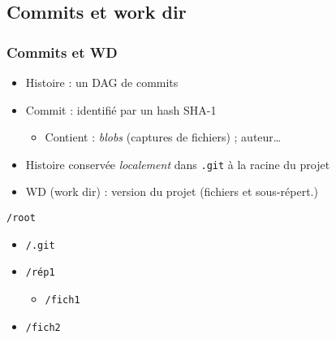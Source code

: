 \documentclass[english, french]{beamer}
\begin{document}
\subsection[Commits et work dir]{Commits et work dir}
\begin{frame}
	\frametitle{Commits et WD}
	\begin{itemize}
		\item Histoire : un DAG de \og{}commits\fg{}
		\item Commit : identifié par un hash SHA-1
		\begin{itemize}
			\item Contient : \emph{blobs} (captures de fichiers) ; auteur…
		\end{itemize}
	\end{itemize}
	{
		\centering
		\par
	}
	\begin{itemize}
		\item Histoire conservée \emph{localement} dans \texttt{.git} à la racine du projet
		\item WD (\og{}work dir\fg{}) : version du projet (fichiers et sous-répert.)
	\end{itemize}
	\texttt{/root}
	\begin{itemize}
		\item[] \texttt{/.git}
		\item[] \texttt{/rép1}
		\begin{itemize}
			\item[] \texttt{/fich1}
		\end{itemize}
		\item[] \texttt{/fich2}
	\end{itemize}
\end{frame}
\end{document}
